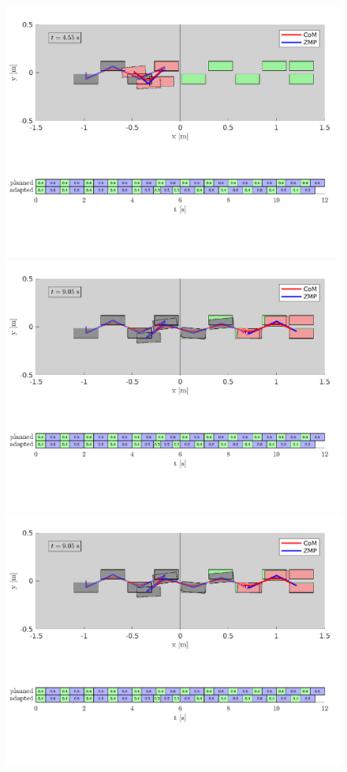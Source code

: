 \begin{figure}
    \centering
    \includegraphics[trim={0 5.9cm 0 0.7cm},clip,width=\textwidth]{figures/two-patches-mixed-integer-after-push.pdf}
    \includegraphics[trim={0 5.9cm 0 0.7cm},clip,width=\textwidth]{figures/two-patches-mixed-integer-completing-task.pdf}
    \includegraphics[trim={0 2.2cm 0 8.6cm},clip,width=\textwidth]{figures/two-patches-mixed-integer-completing-task.pdf}

\end{figure}
